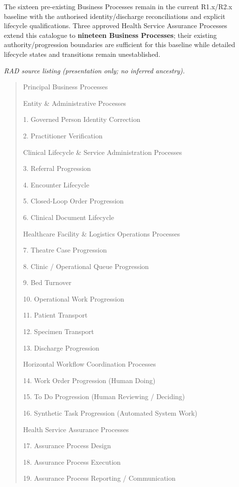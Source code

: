 The sixteen pre-existing Business Processes remain in the current R1.x/\allowbreak{}R2.x baseline with the authorised identity/\allowbreak{}discharge reconciliations and explicit lifecycle qualifications. Three approved Health Service Assurance Processes extend this catalogue to \textbf{nineteen Business Processes}; their existing authority/\allowbreak{}progression boundaries are sufficient for this baseline while detailed lifecycle states and transitions remain unestablished.

\label{rad:processes:37}

\textit{RAD source listing (presentation only; no inferred ancestry).}
\begin{quote}
Principal Business Processes

Entity \& Administrative Processes

1. Governed Person Identity Correction

2. Practitioner Verification

Clinical Lifecycle \& Service Administration Processes

3. Referral Progression

4. Encounter Lifecycle

5. Closed-Loop Order Progression

6. Clinical Document Lifecycle

Healthcare Facility \& Logistics Operations Processes

7. Theatre Case Progression

8. Clinic / Operational Queue Progression

9. Bed Turnover

10. Operational Work Progression

11. Patient Transport

12. Specimen Transport

13. Discharge Progression

Horizontal Workflow Coordination Processes

14. Work Order Progression (Human Doing)

15. To Do Progression (Human Reviewing / Deciding)

16. Synthetic Task Progression (Automated System Work)

Health Service Assurance Processes

17. Assurance Process Design

18. Assurance Process Execution

19. Assurance Process Reporting / Communication
\end{quote}
\label{rad:processes:65}

